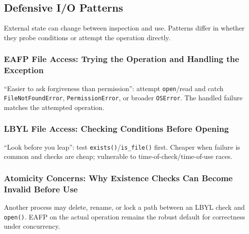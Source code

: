 \subsection{Defensive I/O Patterns}

External state can change between inspection and use. Patterns differ in whether they probe conditions or attempt the operation directly.

\subsubsection{EAFP File Access: Trying the Operation and Handling the Exception}

``Easier to ask forgiveness than permission'': attempt \texttt{open}/read and catch \texttt{FileNotFoundError}, \texttt{PermissionError}, or broader \texttt{OSError}. The handled failure matches the attempted operation.

\subsubsection{LBYL File Access: Checking Conditions Before Opening}

``Look before you leap'': test \texttt{exists()}/\texttt{is\_file()} first. Cheaper when failure is common and checks are cheap; vulnerable to time-of-check/time-of-use races.

\subsubsection{Atomicity Concerns: Why Existence Checks Can Become Invalid Before Use}

Another process may delete, rename, or lock a path between an LBYL check and \texttt{open()}. EAFP on the actual operation remains the robust default for correctness under concurrency.

